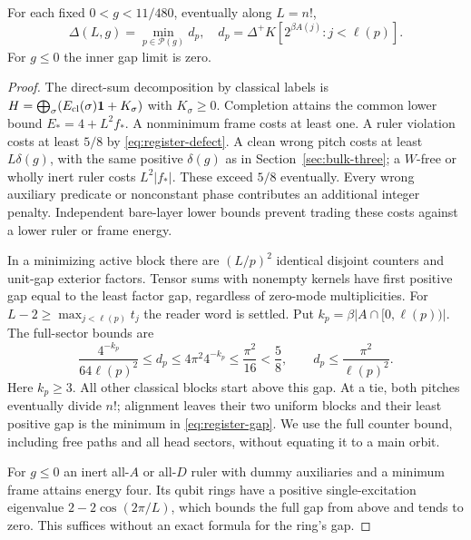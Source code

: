 \begin{lemma}\label{lem:register-gap}
For each fixed $0<g<11/480$, eventually along $L=n!$,
\begin{equation}\label{eq:register-gap}
 \Delta(L,g)=\min_{p\in\mathcal P(g)}d_p,\quad
 d_p=\Delta^+K[2^{\beta A(j)}:j<\ell(p)].
\end{equation}
For $g\leq0$ the inner gap limit is zero.
\end{lemma}
\begin{proof}
The direct-sum decomposition by classical labels is
$H=\bigoplus_\sigma(E_{\rm cl}(\sigma)\mathbf 1+K_\sigma)$ with
$K_\sigma\geq0$. Completion attains the common lower bound
$E_*=4+L^2f_*$. A nonminimum frame costs at least one. A ruler
violation costs at least $5/8$ by \eqref{eq:register-defect}.
A clean wrong pitch costs at least $L\delta(g)$, with the same
positive $\delta(g)$ as in Section~\ref{sec:bulk-three}; a $W$-free
or wholly inert ruler costs $L^2|f_*|$. These exceed $5/8$ eventually.
Every wrong auxiliary predicate or nonconstant phase contributes an
additional integer penalty. Independent bare-layer lower bounds
prevent trading these costs against a lower ruler or frame energy.

In a minimizing active block there are $(L/p)^2$ identical disjoint
counters and unit-gap exterior factors. Tensor sums with nonempty
kernels have first positive gap equal to the least factor gap,
regardless of zero-mode multiplicities. For
$L-2\geq\max_{j<\ell(p)}t_j$ the reader word is settled. Put
$k_p=\beta|A\cap[0,\ell(p))|$. The full-sector bounds are
\begin{equation}\label{eq:register-bracket}
 \frac{4^{-k_p}}{64\ell(p)^2}\leq d_p
 \leq4\pi^2 4^{-k_p}\leq\frac{\pi^2}{16}<\frac58,
 \qquad d_p\leq\frac{\pi^2}{\ell(p)^2}.
\end{equation}
Here $k_p\geq3$. All other classical blocks start above this gap.
At a tie, both pitches eventually divide $n!$; alignment leaves
their two uniform blocks and their least positive gap is the minimum
in \eqref{eq:register-gap}. We use the full counter bound, including
free paths and all head sectors, without equating it to a main orbit.

For $g\leq0$ an inert all-$A$ or all-$D$ ruler with dummy auxiliaries
and a minimum frame attains energy four. Its qubit rings have a
positive single-excitation eigenvalue
$2-2\cos(2\pi/L)$, which bounds the full gap from above and tends
to zero. This suffices without an exact formula for the ring's gap.
\end{proof}


